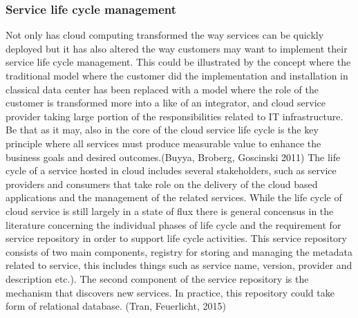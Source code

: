 \documentclass{article}
\begin{document}
\subsubsection{Service life cycle management}
Not only has cloud computing transformed the way services can be quickly deployed but it has also altered the way customers may want to implement their service life cycle management.
This could be illustrated by the concept where the traditional model where the customer did the implementation and installation in classical data center has been replaced with a model where the role of the customer is transformed more into a like of an integrator, and cloud service provider taking large portion of the responsibilities related to IT infrastructure. Be that as it may, also in the core of the cloud service life cycle is the key principle where all services must produce measurable value to enhance the business goals and desired outcomes.(Buyya, Broberg, Goscinski 2011)
The life cycle of a service hosted in cloud includes several stakeholders, such as service providers and consumers that take role on the delivery of the cloud based applications and the management of the related services. While the life cycle of cloud service is still largely in a state of flux there is general concensus in the literature concerning the individual phases of life cycle and the requirement for service repository in order to support life cycle activities.
This service repository consists of two main components, registry for storing and managing the metadata related to service, this includes things such as service name, version, provider and description etc.). The second component of the service repository is the mechanism that discovers new services. In practice, this repository could take form of relational database. (Tran, Feuerlicht, 2015)
\par
\end{document}
